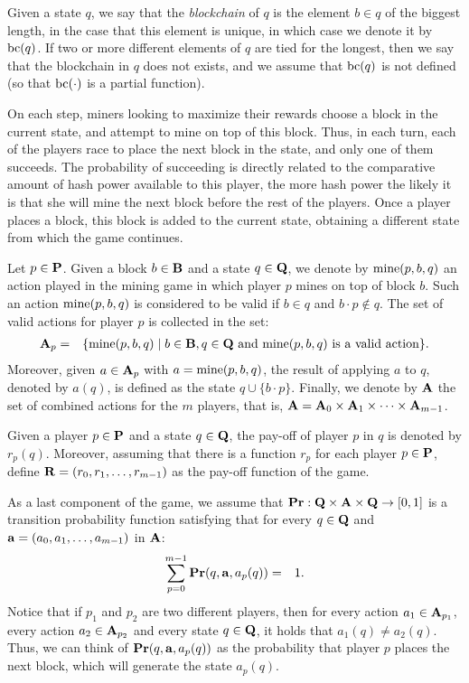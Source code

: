 Given a state $q$, we say that the {\em blockchain} of $q$ is the element $b\in q$ of the biggest length, in the case that this element is unique, in which case we denote it by $\text{bc}(q)$. If two or more different elements of $q$ are tied for the longest, then we say that the blockchain in $q$ does not exists, and we assume that $\text{bc}(q)$ is not defined (so that $\text{bc}(\cdot)$ is a partial function).

On each step, miners looking to maximize their rewards choose a block in the current state, and attempt to mine on top of this block. Thus, in each turn, each of the players race to place the next block in the state, and only one of them succeeds. The probability of succeeding is directly related to the comparative amount of hash power available to this player, the more hash power the likely it is that she will mine the next block before the rest of the players. Once a player places a block, this block is added to the current state, obtaining a different state from which the game continues.

Let $p \in \mathbf{P}$. Given a block $b \in \mathbf{B}$ and a state $q \in \mathbf{Q}$, we denote by $\text{\rm mine}(p,b,q)$ an action played in the mining game in which player $p$ mines on top of block $b$. Such an action $\text{\rm mine}(p,b,q)$ is considered to be valid if $b \in q$ and $b\cdot p \not\in q$. The set of valid actions for player $p$ is collected in the set:
\begin{eqnarray*}
\mathbf{A}_p & = & \{ \text{\rm mine}(p,b,q) \mid b \in \mathbf{B}, q \in \mathbf{Q} \text{ and }\text{\rm mine}(p,b,q) \text{ is a valid action}\}.
\end{eqnarray*}
Moreover, given $a \in \mathbf{A}_p$ with $a = \text{\rm mine}(p,b,q)$, the result of applying $a$ to $q$, denoted by $a(q)$, is defined as the state $q \cup \{b \cdot p\}$. Finally, we denote by $\mathbf{A}$ the set of combined actions for the $m$ players, that is, $\mathbf{A} = \mathbf{A}_0 \times \mathbf{A}_1 \times \cdots \times \mathbf{A}_{m-1}$.

Given a player $p \in \mathbf{P}$ and a state $q \in \mathbf{Q}$, the pay-off of player $p$ in $q$ is denoted by $r_p(q)$. Moreover, assuming that there is a  function $r_p$ for each player $p \in \mathbf{P}$, define $\mathbf{R} = (r_0, r_1, \ldots, r_{m-1})$ as the pay-off function of the game.

As a last component of the game, we assume that $\mathbf{Pr} : \mathbf{Q} \times \mathbf{A} \times \mathbf{Q} \to [0,1]$ is a transition probability function satisfying that for every $q \in \mathbf{Q}$ and $\mathbf{a} = (a_0, a_1, \ldots, a_{m-1})$ in $\mathbf{A}$:
\begin{eqnarray*}\label{eq-prop}
\sum_{p=0}^{m-1} \mathbf{Pr}(q, \mathbf{a}, a_p(q)) & = & 1.
\end{eqnarray*}
Notice that if $p_1$ and $p_2$ are two different players, then for every action $a_1 \in \mathbf{A}_{p_1}$, every action $a_2 \in \mathbf{A}_{p_2}$ and every state $q \in \mathbf{Q}$, it holds that $a_1(q) \neq a_2(q)$. Thus, we can think of $\mathbf{Pr}(q, \mathbf{a}, a_p(q))$ as the probability that player $p$ places the next block, which will generate the state $a_p(q)$. 

